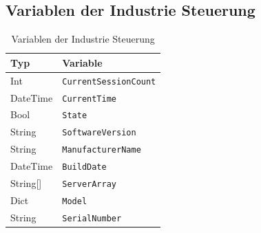 \clearpage

\subsection{Variablen der Industrie Steuerung}

\begin{table}[H]
\centering
\begin{tabular}{|p{3cm}|p{5cm}|}
\hline
\textbf{Typ} & \textbf{Variable} \\
\hline
Int & \texttt{CurrentSessionCount} \\
\hline
DateTime & \texttt{CurrentTime} \\
\hline
Bool & \texttt{State} \\
\hline
String & \texttt{SoftwareVersion} \\
\hline
String & \texttt{ManufacturerName} \\
\hline
DateTime & \texttt{BuildDate} \\
\hline
String[] & \texttt{ServerArray} \\
\hline
Dict & \texttt{Model} \\
\hline
String & \texttt{SerialNumber} \\
\hline
\end{tabular}
\caption{Variablen der Industrie Steuerung}
\end{table}
